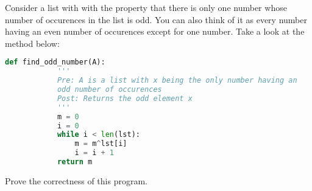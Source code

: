 \documentclass{article}
\begin{document}
    Consider a list with with the property that there is only one number whose number of occurences in the list is odd. You can also think of it as every number having an even number of occurences except for one number. Take a look at the method below:

    \begin{lstlisting}[language=Python]
        def find_odd_number(A):
            '''
            Pre: A is a list with x being the only number having an
            odd number of occurences
            Post: Returns the odd element x
            '''
            m = 0
            i = 0
            while i < len(lst):
                m = m^lst[i]
                i = i + 1
            return m
    \end{lstlisting}

    \noindent Prove the correctness of this program.
    \vfill
\end{document}
